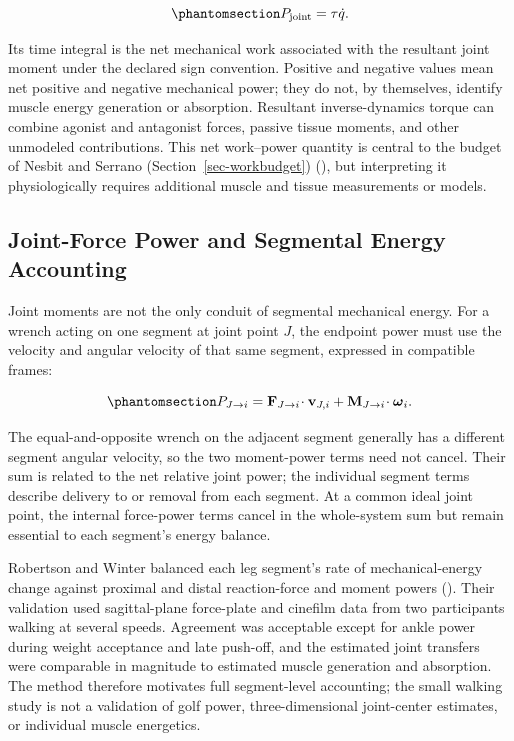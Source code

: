 \documentclass[
  letterpaper,
]{report}
\begin{document}
\begin{equation}\phantomsection\label{eq-net-joint-power}{
P_{\mathrm{joint}} = \tau\dot q.
}\end{equation}

Its time integral is the net mechanical work associated with the
resultant joint moment under the declared sign convention. Positive and
negative values mean net positive and negative mechanical power; they do
not, by themselves, identify muscle energy generation or absorption.
Resultant inverse-dynamics torque can combine agonist and antagonist
forces, passive tissue moments, and other unmodeled contributions. This
net work--power quantity is central to the budget of Nesbit and Serrano
(Section~\ref{sec-workbudget}) (), but interpreting it physiologically requires additional
muscle and tissue measurements or models.

\subsection{Joint-Force Power and Segmental Energy
Accounting}\label{sec-rw}

Joint moments are not the only conduit of segmental mechanical energy.
For a wrench acting on one segment at joint point \(J\), the endpoint
power must use the velocity and angular velocity of that same segment,
expressed in compatible frames:

\begin{equation}\phantomsection\label{eq-segment-endpoint-power}{
P_{J\rightarrow i}
= \mathbf{F}_{J\rightarrow i}\!\cdot\mathbf{v}_{J,i}
+ \mathbf{M}_{J\rightarrow i}\!\cdot\boldsymbol{\omega}_i.
}\end{equation}

The equal-and-opposite wrench on the adjacent segment generally has a
different segment angular velocity, so the two moment-power terms need
not cancel. Their sum is related to the net relative joint power; the
individual segment terms describe delivery to or removal from each
segment. At a common ideal joint point, the internal force-power terms
cancel in the whole-system sum but remain essential to each segment's
energy balance.

Robertson and Winter balanced each leg segment's rate of
mechanical-energy change against proximal and distal reaction-force and
moment powers ().
Their validation used sagittal-plane force-plate and cinefilm data from
two participants walking at several speeds. Agreement was acceptable
except for ankle power during weight acceptance and late push-off, and
the estimated joint transfers were comparable in magnitude to estimated
muscle generation and absorption. The method therefore motivates full
segment-level accounting; the small walking study is not a validation of
golf power, three-dimensional joint-center estimates, or individual
muscle energetics.
\end{document}
